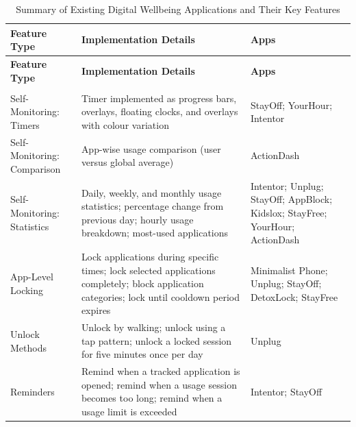 \documentclass[11pt]{report}
\begin{document}
\begin{center}
\footnotesize

\begin{longtable}{|>{\raggedright\arraybackslash}p{}|
                  >{\raggedright\arraybackslash}p{}|
                  >{\raggedright\arraybackslash}p{}|}

\caption{Summary of Existing Digital Wellbeing Applications and Their Key Features}
\label{tab:digital_detox_apps}\\

\hline
\textbf{Feature Type} & \textbf{Implementation Details} & \textbf{Apps} \\
\hline \endfirsthead

\hline \textbf{Feature Type} & \textbf{Implementation Details} & \textbf{Apps} \\
\hline \endhead

\hline \multicolumn{3}{r}{\textit{Continued on next page}}\\
\hline \endfoot

\hline \endlastfoot

Self-Monitoring: Timers & Timer implemented as progress bars, overlays, floating clocks, and overlays with colour variation & StayOff; YourHour; Intentor \\
\hline

Self-Monitoring: Comparison & App-wise usage comparison (user versus global average) & ActionDash \\
\hline

Self-Monitoring: Statistics & Daily, weekly, and monthly usage statistics; percentage change from previous day; hourly usage breakdown; most-used applications &  Intentor; Unplug; StayOff; AppBlock; Kidslox; StayFree; YourHour; ActionDash \\
\hline

App-Level Locking & Lock applications during specific times; lock selected applications completely; block application categories; lock until cooldown period expires & Minimalist Phone; Unplug; StayOff; DetoxLock; StayFree \\
\hline

Unlock Methods & Unlock by walking; unlock using a tap pattern; unlock a locked session for five minutes once per day & Unplug \\
\hline

Reminders & Remind when a tracked application is opened; remind when a usage session becomes too long; remind when a usage limit is exceeded & Intentor; StayOff \\
\hline


\end{longtable}
\end{center}
\end{document}
